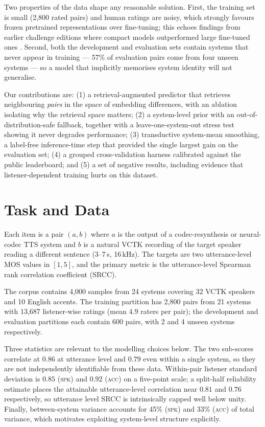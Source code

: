 \documentclass{article}
\begin{document}
Two properties of the data shape any reasonable solution. First, the training
set is small (2{,}800 rated pairs) and human ratings are noisy, which strongly
favours frozen pretrained representations over fine-tuning; this echoes findings
from earlier challenge editions where compact models outperformed large
fine-tuned ones \cite{vmc23}. Second, both the development and evaluation sets
contain systems that never appear in training --- 57\% of evaluation pairs come
from four unseen systems --- so a model that implicitly memorises system
identity will not generalise.

Our contributions are: (1) a retrieval-augmented predictor that retrieves
neighbouring \emph{pairs} in the space of embedding differences, with an
ablation isolating why the retrieval space matters; (2) a system-level prior
with an out-of-distribution-safe fallback, together with a leave-one-system-out
stress test showing it never degrades performance; (3) transductive system-mean
smoothing, a label-free inference-time step that provided the single largest
gain on the evaluation set; (4) a grouped cross-validation harness calibrated
against the public leaderboard; and (5) a set of negative results, including
evidence that listener-dependent training hurts on this dataset.

\section{Task and Data}

Each item is a pair $(a,b)$ where $a$ is the output of a codec-resynthesis or
neural-codec TTS system and $b$ is a natural VCTK recording of the target
speaker reading a different sentence (3--7\,s, 16\,kHz). The targets are two
utterance-level MOS values in $[1,5]$, and the primary metric is the
utterance-level Spearman rank correlation coefficient (SRCC).

The corpus \cite{codecmos} contains 4{,}000 samples from 24 systems covering 32
VCTK speakers and 10 English accents. The training partition has 2{,}800 pairs
from 21 systems with 13{,}687 listener-wise ratings (mean 4.9 raters per pair);
the development and evaluation partitions each contain 600 pairs, with 2 and 4
unseen systems respectively.

Three statistics are relevant to the modelling choices below. The two sub-scores
correlate at $0.86$ at utterance level and $0.79$ even within a single system,
so they are not independently identifiable from these data. Within-pair listener
standard deviation is $0.85$ (\textsc{spk}) and $0.92$ (\textsc{acc}) on a
five-point scale; a split-half reliability estimate places the attainable
utterance-level correlation near $0.81$ and $0.76$ respectively, so utterance
level SRCC is intrinsically capped well below unity. Finally, between-system
variance accounts for 45\% (\textsc{spk}) and 33\% (\textsc{acc}) of total
variance, which motivates exploiting system-level structure explicitly.
\end{document}
